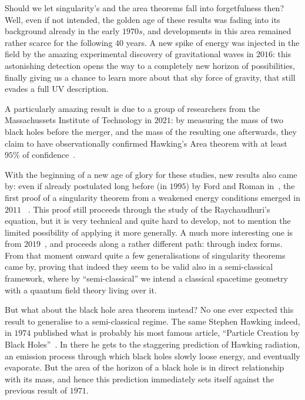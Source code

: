 Should we let singularity's and the area theorems fall into forgetfulness then? Well, even if not intended, the golden age of these results was fading into its background already in the early \(1970s\), and developments in this area remained rather scarce for the following \(40\) years. A new spike of energy was injected in the field by the amazing experimental discovery of gravitational waves in \(2016\): this astonishing detection opens the way to a completely new horizon of possibilities, finally giving us a chance to learn more about that shy force of gravity, that still evades a full UV description.

A particularly amazing result is due to a group of researchers from the Massachussets Institute of Technology in \(2021\): by measuring the mass of two black holes before the merger, and the mass of the resulting one afterwards, they claim to have observationally confirmed Hawking's Area theorem with at least \(95\%\) of confidence~\cite[]{PhysRevLett.127.011103}.

With the beginning of a new age of glory for these studies, new results also came by: even if already postulated long before (in \(1995\)) by Ford and Roman in~\cite[]{ford1996averaged}, the first proof of a singularity theorem from a weakened energy conditions emerged in \(2011\)~\cite[]{fewster2011singularity} . This proof still proceeds through the study of the Raychaudhuri's equation, but it is very technical and quite hard to develop, not to mention the limited possibility of applying it more generally. A much more interesting one is from \(2019\)~\cite[]{fewster2020new}, and proceeds along a rather different path: through index forms.
From that moment onward quite a few generalisations of singularity theorems came by, proving that indeed they seem to be valid also in a semi-classical framework, where by ``semi-classical'' we intend a classical spacetime geometry with a quantum field theory living over it.

But what about the black hole area theorem instead? No one ever expected this result to generalise to a semi-classical regime. The same Stephen Hawking indeed, in \(1974\) published what is probably his most famous article, ``Particle Creation by Black Holes''~\cite[]{hawking1975particle}. In there he gets to the staggering prediction of Hawking radiation, an emission process through which black holes slowly loose energy, and eventually evaporate. But the area of the horizon of a black hole is in direct relationship with its mass, and hence this prediction immediately sets itself against the previous result of \(1971\).


